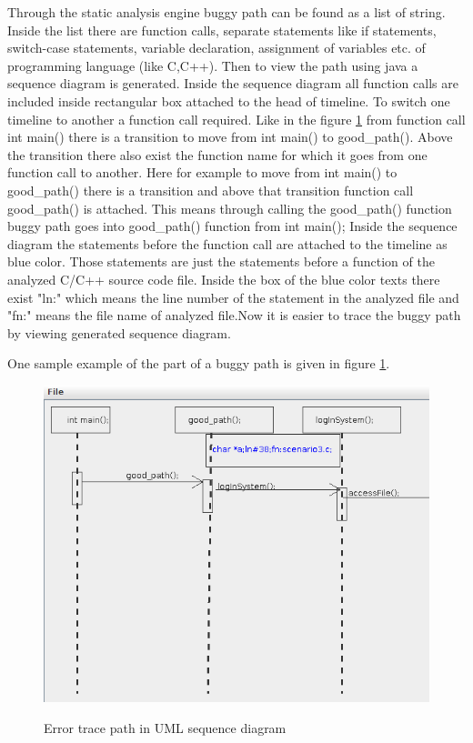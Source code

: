 Through the static analysis engine buggy path can be found as a list of string. Inside the list there are function calls, separate statements like if statements, switch-case statements, variable declaration, assignment of variables etc. of programming language (like C,C++). Then to view the path using java a sequence diagram is generated. Inside the sequence diagram all function calls are included inside rectangular box attached to the head of timeline. To switch one timeline to another a function call required. Like in the figure \ref{Error_trace_path} from function call int main() there is a transition to move from int main() to good\_path(). Above the transition there also exist the function name for which it goes from one function call to another. Here for example to move from int main() to good\_path() there is a transition and above that transition function call good\_path() is attached. This means through calling the good\_path() function buggy path goes into good\_path() function from int main(); Inside the sequence diagram the statements before the function call are attached to the timeline as blue color. Those statements are just the statements before a function of the analyzed C/C++ source code file. Inside the box of the blue color texts there exist "ln:" which means the line number of the statement in the analyzed file and "fn:" means the file name of analyzed file.Now it is easier to trace the buggy path by viewing generated sequence diagram.

 One sample example of the part of a buggy path is given in figure \ref{Error_trace_path}.
\begin{figure}[htbp]
	\centering
	\includegraphics{styles/error_trace_path.png}
	\label{Error_trace_path}
	\caption{Error trace path in UML sequence diagram}
\end{figure}

